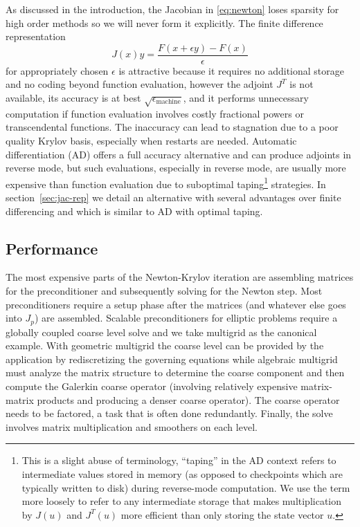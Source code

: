 As discussed in the introduction, the Jacobian in \eqref{eq:newton} loses sparsity for high order methods so we will
never form it explicitly.  The finite difference representation
\begin{equation*}
J(x) y = \frac{F(x+\epsilon y) - F(x)}{\epsilon}
\end{equation*}
for appropriately chosen $\epsilon$ is attractive because it requires no additional storage and no coding beyond
function evaluation, however the adjoint $J^T$ is not available, its accuracy is at best
$\sqrt{\epsilon_{\text{machine}}}$, and it performs unnecessary computation if function evaluation involves costly
fractional powers or transcendental functions.  The inaccuracy can lead to stagnation due to a poor quality Krylov
basis, especially when restarts are needed.  Automatic differentiation (AD) offers a full accuracy alternative and can
produce adjoints in reverse mode, but such evaluations, especially in reverse mode, are usually more expensive than
function evaluation due to suboptimal taping\footnote{This is a slight abuse of terminology, ``taping'' in the AD
  context refers to intermediate values stored in memory (as opposed to checkpoints which are typically written to disk)
  during reverse-mode computation.  We use the term more loosely to refer to any intermediate storage that makes
  multiplication by $J(u)$ and $J^T(u)$ more efficient than only storing the state vector $u$.} strategies.  In
section~\ref{sec:jac-rep} we detail an alternative with several advantages over finite differencing and which is similar
to AD with optimal taping.

\subsection{Performance}\label{sec:jfnk:bottlenecks}
The most expensive parts of the Newton-Krylov iteration are assembling matrices for the preconditioner and subsequently
solving for the Newton step.  Most preconditioners require a setup phase after the matrices (and whatever else goes into
$J_p$) are assembled.  Scalable preconditioners for elliptic problems require a globally coupled coarse level solve and we take multigrid as
the canonical example.  With geometric multigrid the coarse level can be provided by the application by rediscretizing
the governing equations while algebraic multigrid must analyze the matrix structure to determine the coarse component
and then compute the Galerkin coarse operator (involving relatively expensive matrix-matrix products and producing a
denser coarse operator).  The coarse operator needs to be factored, a task that is often done redundantly.  Finally, the
solve involves matrix multiplication and smoothers on each level.

